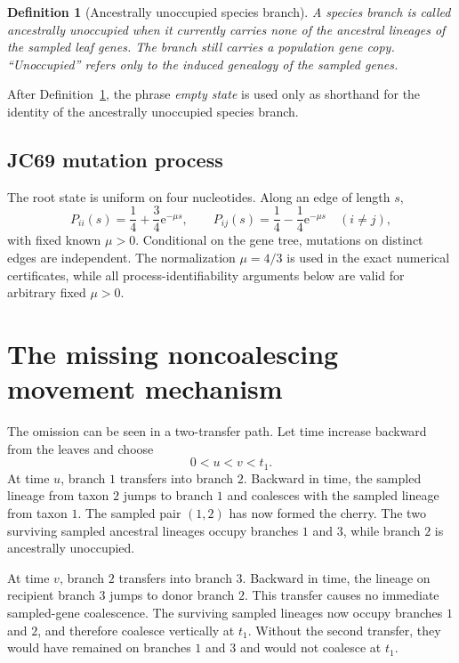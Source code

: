 \documentclass[11pt]{article}
\newtheorem{definition}[theorem]{Definition}
\newcommand{\e}{\mathrm e}
\begin{document}
\begin{definition}[Ancestrally unoccupied species branch]\label{def:unoccupied}
A species branch is called \emph{ancestrally unoccupied} when it currently carries none of the ancestral lineages of the sampled leaf genes.  The branch still carries a population gene copy.  ``Unoccupied'' refers only to the induced genealogy of the sampled genes.
\end{definition}

After Definition~\ref{def:unoccupied}, the phrase \emph{empty state} is used only as shorthand for the identity of the ancestrally unoccupied species branch.

\subsection{JC69 mutation process}
The root state is uniform on four nucleotides.  Along an edge of length $s$,
\[
P_{ii}(s)=\frac14+\frac34\e^{-\mu s},
\qquad
P_{ij}(s)=\frac14-\frac14\e^{-\mu s}\quad(i\ne j),
\]
with fixed known $\mu>0$.  Conditional on the gene tree, mutations on distinct edges are independent.  The normalization $\mu=4/3$ is used in the exact numerical certificates, while all process-identifiability arguments below are valid for arbitrary fixed $\mu>0$.

\section{The missing noncoalescing movement mechanism}\label{sec:missing}

The omission can be seen in a two-transfer path.  Let time increase backward from the leaves and choose
\[
0<u<v<t_1.
\]
At time $u$, branch $1$ transfers into branch $2$.  Backward in time, the sampled lineage from taxon $2$ jumps to branch $1$ and coalesces with the sampled lineage from taxon $1$.  The sampled pair $(1,2)$ has now formed the cherry.  The two surviving sampled ancestral lineages occupy branches $1$ and $3$, while branch $2$ is ancestrally unoccupied.

At time $v$, branch $2$ transfers into branch $3$.  Backward in time, the lineage on recipient branch $3$ jumps to donor branch $2$.  This transfer causes no immediate sampled-gene coalescence.  The surviving sampled lineages now occupy branches $1$ and $2$, and therefore coalesce vertically at $t_1$.  Without the second transfer, they would have remained on branches $1$ and $3$ and would not coalesce at $t_1$.
\end{document}
